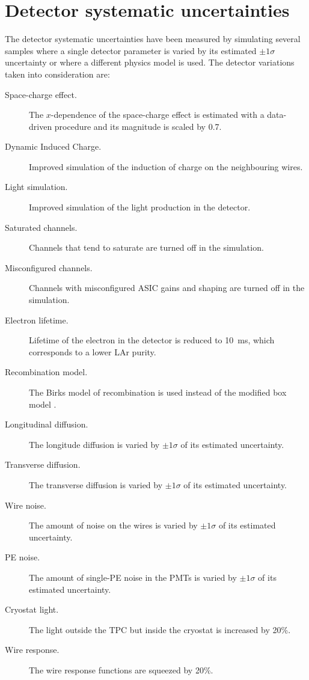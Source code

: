 \section{Detector systematic uncertainties}
The detector systematic uncertainties have been measured by simulating several samples where a single detector parameter is varied by its estimated $\pm1\sigma$ uncertainty or where a different physics model is used. The detector variations taken into consideration are:
\begin{description}
\item[Space-charge effect.] The $x$-dependence of the space-charge effect is estimated with a data-driven procedure and its magnitude is scaled by 0.7.
\item[Dynamic Induced Charge.] Improved simulation of the induction of charge on the neighbouring wires.
\item[Light simulation.] Improved simulation of the light production in the detector.
\item[Saturated channels.] Channels that tend to saturate are turned off in the simulation.
\item[Misconfigured channels.] Channels with misconfigured ASIC gains and shaping are turned off in the simulation.
\item[Electron lifetime.] Lifetime of the electron in the detector is reduced to 10~ms, which corresponds to a lower LAr purity.
\item[Recombination model.] The Birks model of recombination \cite{Amoruso:2004dy} is used instead of the modified box model \cite{Acciarri:2013met}. 
\item[Longitudinal diffusion.] The longitude diffusion is varied by $\pm1\sigma$ of its estimated uncertainty.
\item[Transverse diffusion.] The transverse diffusion is varied by $\pm1\sigma$ of its estimated uncertainty.
\item[Wire noise.] The amount of noise on the wires is varied by $\pm1\sigma$ of its estimated uncertainty.
\item[PE noise.] The amount of single-PE noise in the PMTs is varied by $\pm1\sigma$ of its estimated uncertainty.
\item[Cryostat light.] The light outside the TPC but inside the cryostat is increased by 20\%.
\item[Wire response.] The wire response functions are squeezed by 20\%.
\end{description}

